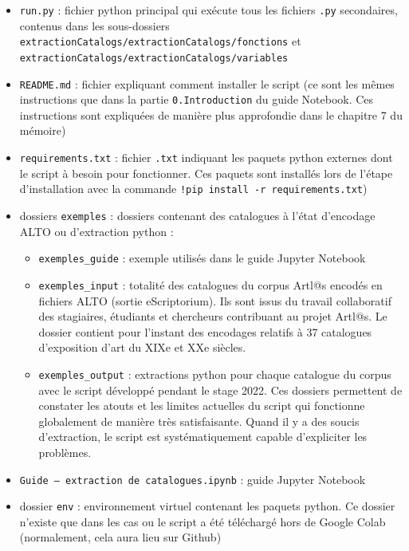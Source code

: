\documentclass[a4paper,12pt,twoside]{book}
\begin{document}
\begin{itemize}
\item \texttt{run.py} : fichier python principal qui exécute tous les fichiers \texttt{.py} secondaires, contenus dans les sous-dossiers \texttt{extractionCatalogs/extractionCatalogs/fonctions} et \texttt{extractionCatalogs/extractionCatalogs/variables}

\item \texttt{README.md} : fichier expliquant comment installer le script (ce sont les mêmes instructions que dans la partie \texttt{0.Introduction} du guide Notebook. Ces instructions sont expliquées de manière plus approfondie dans le chapitre 7 du mémoire)

\item \texttt{requirements.txt} : fichier \texttt{.txt} indiquant les paquets python externes dont le script à besoin pour fonctionner. Ces paquets sont installés lors de l'étape d'installation avec la commande \texttt{!pip install -r requirements.txt})

\item dossiers \texttt{exemples} : dossiers contenant des catalogues à l'état d'encodage ALTO ou d'extraction python :
\begin{itemize}
	\item \texttt{exemples\_guide} : exemple utilisés dans le guide Jupyter Notebook
	\item \texttt{exemples\_input} : totalité des catalogues du corpus Artl@s encodés en fichiers ALTO (sortie eScriptorium). Ils sont issus du travail collaboratif des stagiaires, étudiants et chercheurs contribuant au projet Artl@s. Le dossier contient pour l'instant des encodages relatifs à 37 catalogues d'exposition d'art du XIXe et XXe siècles.
	\item \texttt{exemples\_output} : extractions python pour chaque catalogue du corpus avec le script développé pendant le stage 2022. Ces dossiers permettent de constater les atouts et les limites actuelles du script qui fonctionne globalement de manière très satisfaisante. Quand il y a des soucis d'extraction, le script est systématiquement capable d'expliciter les problèmes.
\end{itemize}

\item \texttt{Guide – extraction de catalogues.ipynb} : guide Jupyter Notebook

\item dossier \texttt{env} : environnement virtuel contenant les paquets python. Ce dossier n'existe que dans les cas ou le script a été téléchargé hors de Google Colab (normalement, cela aura lieu sur Github)
\end{itemize}
\end{document}
